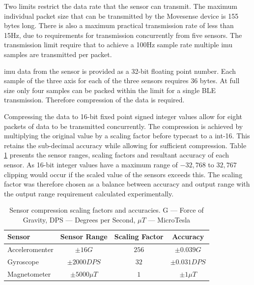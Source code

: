 Two limits restrict the data rate that the sensor can transmit. The maximum individual packet size that can be transmitted by the Movesense device is 155 bytes long. There is also a maximum practical transmission rate of less than 15Hz, due to requirements for transmission concurrently from five sensors. The transmission limit require that to achieve a 100Hz sample rate multiple \acrshort{imu} samples are transmitted per packet.

\acrshort{imu} data from the sensor is provided as a 32-bit floating point number. Each sample of the three axis for each of the three sensors requires 36 bytes. At full size only four samples can be packed within the limit for a single BLE transmission. Therefore compression of the data is required.

Compressing the data to 16-bit fixed point signed integer values allow for eight packets of data to be transmitted concurrently. The compression is achieved by multiplying the original value by a scaling factor before typecast to a int-16. This retains the sub-decimal accuracy while allowing for sufficient compression. Table \ref{tab:methods-imu-data-compression-factors} presents the sensor ranges, scaling factors and resultant accuracy of each sensor. As 16-bit integer values have a maximum range of $-32,768$ to $32,767$ clipping would occur if the scaled value of the sensors exceeds this. The scaling factor was therefore chosen as a balance between accuracy and output range with the output range requirement calculated experimentally.

\begin{table}[!hbt]
    \centering
    \caption[Sensor compression scaling factors and accuracies]{Sensor compression scaling factors and accuracies. G --- Force of Gravity, DPS --- Degrees per Second, $\mu T$ --- MicroTesla}
    \label{tab:methods-imu-data-compression-factors}
    
    \begin{tabular}{l|ccc}
         \textbf{Sensor} & \textbf{Sensor Range} & \textbf{Scaling Factor} & \textbf{Accuracy} \\
         \hline
         Acceleromenter & $\pm16 G$ & $256$ & $\pm0.039 G$  \\
         Gyroscope & $\pm2000 DPS$ & $32$ & $\pm0.031 DPS$  \\
         Magnetometer & $\pm5000\mu T$ & $1$ & $\pm1\mu T$
    \end{tabular}
\end{table}

